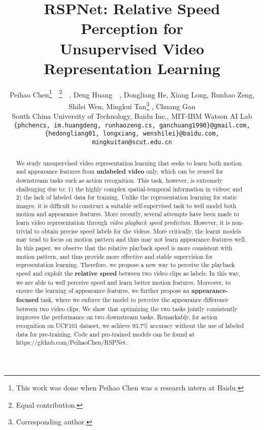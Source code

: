 \documentclass[final]{cvpr}
\begin{document}
\title{RSPNet: Relative Speed Perception for \\Unsupervised Video Representation Learning}

\author{
	Peihao Chen\thanks{This work was done when Peihao Chen was a research intern at Baidu.}~~\thanks{Equal contribution.}~~, Deng Huang~~, Dongliang He, Xiang Long, Runhao Zeng, \\
	Shilei Wen, Mingkui Tan\thanks{Corresponding author.} , Chuang Gan  \\
	South China University of Technology, Baidu Inc., MIT-IBM Watson AI Lab \\
	{\tt\small \{phchencs, im.huangdeng, runhaozeng.cs, ganchuang1990\}@gmail.com,} \\
	{\tt\small \{hedongliang01, longxiang, wenshilei\}@baidu.com, 
	mingkuitan@scut.edu.cn}
}
\maketitle


\begin{abstract}
	We study unsupervised video representation learning that seeks to learn both motion and appearance features from \textbf{unlabeled video} only, which can be reused for downstream tasks such as action recognition.
	This task, however, is extremely challenging due to: 1) the highly complex spatial-temporal information in videos; and 2) the lack of labeled data for training. Unlike the representation learning for static images, it is difficult to construct a suitable self-supervised task to well model both motion and appearance features. 
	More recently, several attempts have been made to learn video representation through \textit{video playback speed prediction}. However, it is non-trivial to obtain precise speed labels for the videos. More critically, the learnt models may tend to focus on motion pattern and thus may not learn appearance features well.
	In this paper, we observe that the relative playback speed is more consistent with motion pattern, and thus provide more effective and stable supervision for representation learning.
	Therefore, we propose a new way to perceive the playback speed and exploit the \textbf{relative speed} between two video clips as labels. In this way, we are able to well perceive speed and learn better motion features.
	Moreover, to ensure the learning of appearance features, we further propose an \textbf{appearance-focused} task, where we enforce the model to perceive the appearance difference between two video clips.
	We show that optimizing the two tasks jointly consistently improves the performance on two downstream tasks. 
	Remarkably, for action recognition on UCF101 dataset, we achieve 93.7\% accuracy without the use of labeled data for pre-training. Code and pre-trained models can be found at https://github.com/PeihaoChen/RSPNet.
\end{abstract}
\end{document}
